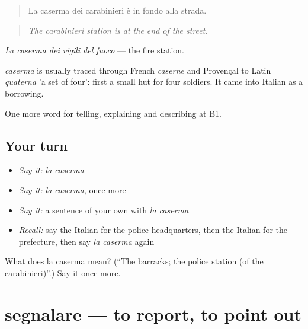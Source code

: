 \begin{quote}
La caserma dei carabinieri è in fondo alla strada.
\end{quote}

\begin{quote}
\emph{The carabinieri station is at the end of the street.}
\end{quote}

\emph{La caserma dei vigili del fuoco} — the fire station.

\begin{cousinweb}
\emph{caserma} is usually traced through French \emph{caserne} and Provençal to Latin \emph{quaterna} 'a set of four': first a small hut for four soldiers. It came into Italian as a borrowing.
\end{cousinweb}

\begin{grammarlens}[title={What you've built}]
One more word for telling, explaining and describing at B1.
\end{grammarlens}

\subsection*{Your turn}
\begin{itemize}
\raggedright
  \item \emph{Say it:} \emph{la caserma}
  \item \emph{Say it:} \emph{la caserma}, once more
  \item \emph{Say it:} a sentence of your own with \emph{la caserma}
  \item \emph{Recall:} say the Italian for the police headquarters, then the Italian for the prefecture, then say \emph{la caserma} again
\end{itemize}

\begin{tcolorbox}[breakable,colback=teal!4,colframe=teal!35!black,title={Before you move on}]
What does la caserma mean? (\textquotedblleft{}The barracks; the police station (of the carabinieri)\textquotedblright{}.) Say it once more.
\end{tcolorbox}
\section[segnalare]{segnalare — to report, to point out}

\label{lesson:IT-C447-segnalare}



